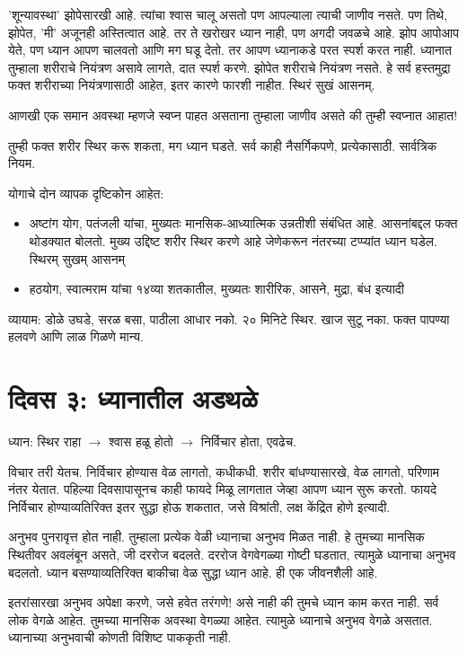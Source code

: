 'शून्यावस्था' झोपेसारखी आहे. त्यांचा श्वास चालू असतो पण आपल्याला त्याची जाणीव नसते. पण तिथे, झोपेत, 'मी' अजूनही अस्तित्वात आहे. तर ते खरोखर ध्यान नाही, पण अगदी जवळचे आहे. झोप आपोआप येते, पण ध्यान आपण चालवतो आणि मग घडू देतो. तर आपण ध्यानाकडे परत स्पर्श करत नाही. ध्यानात तुम्हाला शरीराचे नियंत्रण असावे लागते, दात स्पर्श करणे. झोपेत शरीराचे नियंत्रण नसते. हे सर्व हस्तमुद्रा फक्त शरीराच्या नियंत्रणासाठी आहेत, इतर कारणे फारशी नाहीत. स्थिरं सुखं आसनम्.

आणखी एक समान अवस्था म्हणजे स्वप्न पाहत असताना तुम्हाला जाणीव असते की तुम्ही स्वप्नात आहात!

तुम्ही फक्त शरीर स्थिर करू शकता, मग ध्यान घडते. सर्व काही नैसर्गिकपणे, प्रत्येकासाठी. सार्वत्रिक नियम.

योगाचे दोन व्यापक दृष्टिकोन आहेत:
\begin{itemize}
 \item अष्टांग योग, पतंजली यांचा, मुख्यतः मानसिक-आध्यात्मिक उन्नतीशी संबंधित आहे. आसनांबद्दल फक्त थोडक्यात बोलतो. मुख्य उद्दिष्ट शरीर स्थिर करणे आहे जेणेकरून नंतरच्या टप्प्यांत ध्यान घडेल. स्थिरम् सुखम् आसनम्
 \item  हठयोग, स्वात्मराम यांचा १४व्या शतकातील, मुख्यतः शारीरिक, आसने, मुद्रा, बंध इत्यादी
\end{itemize}

व्यायाम: डोळे उघडे, सरळ बसा, पाठीला आधार नको. २० मिनिटे स्थिर. खाज सुटू नका. फक्त पापण्या हलवणे आणि लाळ गिळणे मान्य.

\section*{दिवस ३: ध्यानातील अडथळे}

ध्यान: स्थिर राहा $\rightarrow$ श्वास हळू होतो $\rightarrow$ निर्विचार होता, एवढेच.

विचार तरी येतच. निर्विचार होण्यास वेळ लागतो, कधीकधी. शरीर बांधण्यासारखे, वेळ लागतो, परिणाम नंतर येतात. पहिल्या दिवसापासूनच काही फायदे मिळू लागतात जेव्हा आपण ध्यान सुरू करतो. फायदे निर्विचार होण्याव्यतिरिक्त इतर सुद्धा होऊ शकतात, जसे विश्रांती, लक्ष केंद्रित होणे इत्यादी.

अनुभव पुनरावृत्त होत नाही. तुम्हाला प्रत्येक वेळी ध्यानाचा अनुभव मिळत नाही. हे तुमच्या मानसिक स्थितीवर अवलंबून असते, जी दररोज बदलते. दररोज वेगवेगळ्या गोष्टी घडतात, त्यामुळे ध्यानाचा अनुभव बदलतो. ध्यान बसण्याव्यतिरिक्त बाकीचा वेळ सुद्धा ध्यान आहे. ही एक जीवनशैली आहे.

इतरांसारखा अनुभव अपेक्षा करणे, जसे हवेत तरंगणे! असे नाही की तुमचे ध्यान काम करत नाही. सर्व लोक वेगळे आहेत. तुमच्या मानसिक अवस्था वेगळ्या आहेत. त्यामुळे ध्यानाचे अनुभव वेगळे असतात. ध्यानाच्या अनुभवाची कोणती विशिष्ट पाककृती नाही.

